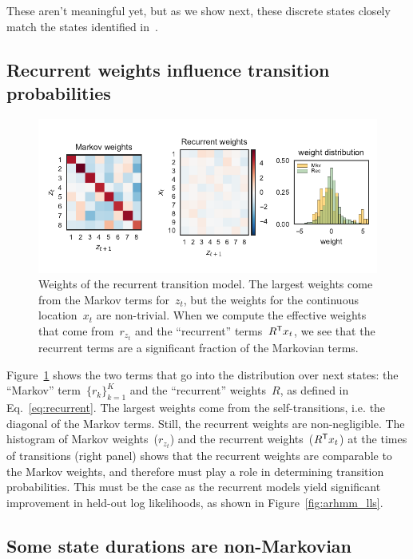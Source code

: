 \documentclass{article}
\begin{document}
These aren't meaningful yet, but as we show next, these discrete states closely
match the states identified in~\citep{kato2015global}. 

\clearpage

\subsection{Recurrent weights influence transition probabilities}

\begin{figure}[h]
\centering%
\includegraphics[width=5.5in]{figures/arhmm/recurrent_weights.pdf}
\caption{Weights of the recurrent transition model.  The largest
  weights come from the Markov terms for~$z_{t}$, but the weights
  for the continuous location~$x_t$ are non-trivial.  When we
  compute the effective weights that come from~$r_{z_t}$ and
  the ``recurrent'' terms~$R^{\mathsf{T}} x_t$, we see that the recurrent terms
  are a significant fraction of the Markovian terms. }
\label{fig:rec_weights}
\end{figure}

Figure~\ref{fig:rec_weights} shows the two terms that go into the
distribution over next states: the ``Markov'' term~$\{r_{k}\}_{k=1}^K$
and the ``recurrent'' weights~$R$, as defined in
Eq.~\eqref{eq:recurrent}. The largest weights come from the
self-transitions, i.e. the diagonal of the Markov terms. Still, the
recurrent weights are non-negligible. The histogram of Markov
weights~($r_{z_t}$) and the recurrent weights~($R^{\mathsf{T}} x_t$) at the
times of transitions (right panel) shows that the recurrent weights
are comparable to the Markov weights, and therefore must play a role
in determining transition probabilities.  This must be the case as the
recurrent models yield significant improvement in held-out log
likelihoods, as shown in Figure~\ref{fig:arhmm_lls}.

\clearpage

\subsection{Some state durations are non-Markovian}
\end{document}

